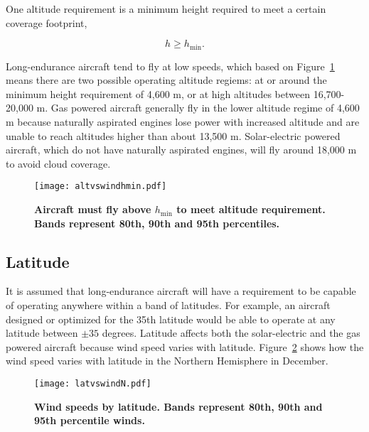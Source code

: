 One altitude requirement is a minimum height required to meet a certain coverage footprint,

\begin{equation}
 h \geq h_{\text{min}}.
\end{equation}

Long-endurance aircraft tend to fly at low speeds, which based on Figure~\ref{f:altvswindhmin} means there are two possible operating altitude regiems: at or around the minimum height requirement of 4,600 m, or at high altitudes between 16,700-20,000 m. 
Gas powered aircraft generally fly in the lower altitude regime of 4,600 m because naturally aspirated engines lose power with increased altitude and are unable to reach altitudes higher than about 13,500 m.  
Solar-electric powered aircraft, which do not have naturally aspirated engines, will fly around 18,000 m to avoid cloud coverage.

\begin{figure}[h!]
	\begin{center}
	\texttt{[image: altvswindhmin.pdf]}
    \caption{\textbf{Aircraft must fly above $h_{\text{min}}$ to meet altitude requirement. Bands represent 80th, 90th and 95th percentiles.\cite{wind}}}
	\label{f:altvswindhmin}
	\end{center}
\end{figure}


\subsection{Latitude}

It is assumed that long-endurance aircraft will have a requirement to be capable of operating anywhere within a band of latitudes.  
For example, an aircraft designed or optimized for the 35th latitude would be able to operate at any latitude between $\pm35$ degrees. 
Latitude affects both the solar-electric and the gas powered aircraft because wind speed varies with latitude. 
Figure~\ref{f:latvswind} shows how the wind speed varies with latitude in the Northern Hemisphere in December. 

\begin{figure}[h!]
	\begin{center}
	\texttt{[image: latvswindN.pdf]}
    \caption{\textbf{Wind speeds by latitude.  Bands represent 80th, 90th and 95th percentile winds.\cite{wind} }}
	\label{f:latvswind}
	\end{center}
\end{figure}

